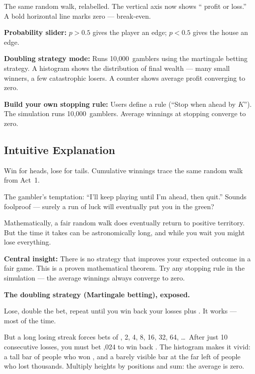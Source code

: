 \documentclass[12pt, a4paper]{article}
\begin{document}
\begin{simulation}
The same random walk, relabelled.  The vertical axis now shows
``\texteuro{} profit or loss.''  A bold horizontal line marks zero ---
break-even.

\textbf{Probability slider:} $p > 0.5$ gives the player an edge;
$p < 0.5$ gives the house an edge.

\textbf{Doubling strategy mode:} Runs 10,000~gamblers using the martingale
betting strategy.  A histogram shows the distribution of final wealth --- many
small winners, a few catastrophic losers.  A counter shows average profit
converging to zero.

\textbf{Build your own stopping rule:} Users define a rule (``Stop when ahead
by \texteuro$K$'').  The simulation runs 10,000~gamblers.  Average winnings at
stopping converge to zero.
\end{simulation}

\subsection{Intuitive Explanation}

\begin{intuition}
Win  for heads, lose  for tails.  Cumulative winnings
trace the same random walk from Act~1.

The gambler's temptation: ``I'll keep playing until I'm ahead, then quit.''
Sounds foolproof --- surely a run of luck will eventually put you in the green?

Mathematically, a fair random walk does eventually return to positive territory.
But the time it takes can be astronomically long, and while you wait you might
lose everything.

\textbf{Central insight:} There is no strategy that improves your expected
outcome in a fair game.  This is a proven mathematical theorem.  Try any
stopping rule in the simulation --- the average winnings always converge to
zero.
\end{intuition}

\begin{intuition}
\textbf{The doubling strategy (Martingale betting), exposed.}

Lose, double the bet, repeat until you win back your losses plus .
It works --- most of the time.

But a long losing streak forces bets of
, 2, 4, 8, 16, 32, 64, \ldots\
After just 10 consecutive losses, you must bet ,024 to win back
.  The histogram makes it vivid: a tall bar of people who won
\texteuro1, and a barely visible bar at the far left of people who lost
thousands.  Multiply heights by positions and sum: the average is zero.
\end{intuition}
\end{document}
